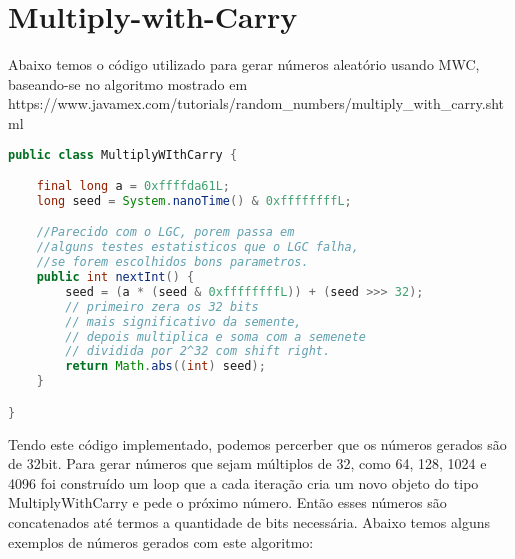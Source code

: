 \documentclass[openany]{ufsctex/ufsctex}
\begin{document}
    \section{Multiply-with-Carry}
        Abaixo temos o código utilizado para gerar números aleatório usando MWC, baseando-se no algoritmo mostrado em https://www.javamex.com/tutorials/random\_numbers/multiply\_with\_carry.shtml
    \begin{lstlisting}[language=Java,breaklines=true, tabsize=2,basicstyle =\fontsize{9}{11}]
public class MultiplyWIthCarry {

    final long a = 0xffffda61L;
    long seed = System.nanoTime() & 0xffffffffL;

    //Parecido com o LGC, porem passa em
    //alguns testes estatisticos que o LGC falha,
    //se forem escolhidos bons parametros.
    public int nextInt() {
        seed = (a * (seed & 0xffffffffL)) + (seed >>> 32); 
        // primeiro zera os 32 bits
        // mais significativo da semente,
        // depois multiplica e soma com a semenete
        // dividida por 2^32 com shift right.
        return Math.abs((int) seed);
    }

}
    \end{lstlisting}
    Tendo este código implementado, podemos percerber que os números gerados são de 32bit. Para gerar números que sejam múltiplos de 32, como 64, 128, 1024 e 4096 foi construído um loop que a cada iteração cria um novo objeto do tipo MultiplyWithCarry e pede o próximo número. Então esses números são concatenados até termos a quantidade de bits necessária. Abaixo temos alguns exemplos de números gerados com este algoritmo: 
 
\end{document}

